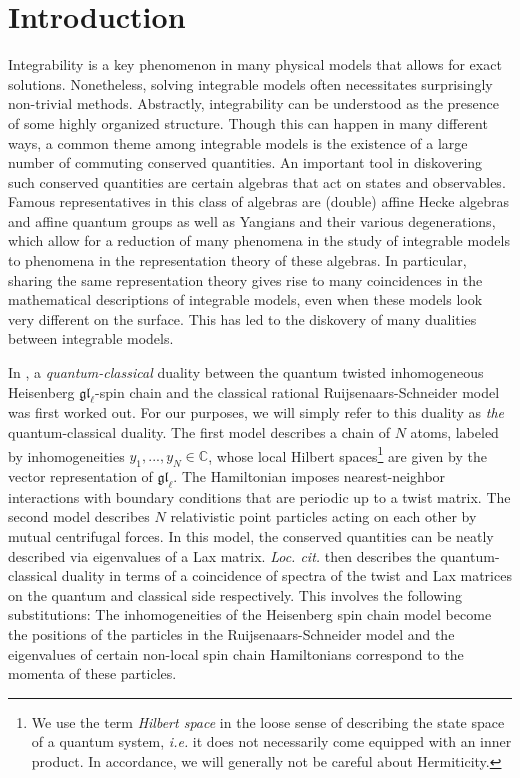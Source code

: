 \documentclass[11pt]{report}
\theoremstyle{definition}
\theoremstyle{remark}
\theoremstyle{remark}
\newcommand{\C}{\mathbb{C}}
\begin{document}
\chapter{Introduction}

Integrability \cite{book:arutyunov:elements} is a key phenomenon in many physical models that allows for exact solutions. Nonetheless, solving integrable models often necessitates surprisingly non-trivial methods. Abstractly, integrability can be understood as the presence of some highly organized structure. Though this can happen in many different ways, a common theme among integrable models is the existence of a large number of commuting conserved quantities. An important tool in diskovering such conserved quantities are certain algebras that act on states and observables. Famous representatives in this class of algebras are (double) affine Hecke algebras and affine quantum groups as well as Yangians and their various degenerations, which allow for a reduction of many phenomena in the study of integrable models to phenomena in the representation theory of these algebras. In particular, sharing the same representation theory gives rise to many coincidences in the mathematical descriptions of integrable models, even when these models look very different on the surface. This has led to the diskovery of many dualities between integrable models.

In \cite{article:gorsky:2014}, a \emph{quantum-classical} duality between the quantum twisted inhomogeneous Heisenberg $\mathfrak{gl}_\ell$-spin chain and the classical rational Ruijsenaars-Schneider model was first worked out. For our purposes, we will simply refer to this duality as \emph{the} quantum-classical duality. The first model describes a chain of $N$ atoms, labeled by inhomogeneities $y_1,...,y_N \in \C$, whose local Hilbert spaces\footnote{We use the term \emph{Hilbert space} in the loose sense of describing the state space of a quantum system, \emph{i.e.} it does not necessarily come equipped with an inner product. In accordance, we will generally not be careful about Hermiticity.} are given by the vector representation of $\mathfrak{gl}_\ell$. The Hamiltonian imposes nearest-neighbor interactions with boundary conditions that are periodic up to a twist matrix. The second model describes $N$ relativistic point particles acting on each other by mutual centrifugal forces. In this model, the conserved quantities can be neatly described via eigenvalues of a Lax matrix. \emph{Loc. cit.} then describes the quantum-classical duality in terms of a coincidence of spectra of the twist and Lax matrices on the quantum and classical side respectively. This involves the following substitutions: The inhomogeneities of the Heisenberg spin chain model become the positions of the particles in the Ruijsenaars-Schneider model and the eigenvalues of certain non-local spin chain Hamiltonians correspond to the momenta of these particles.
\end{document}
